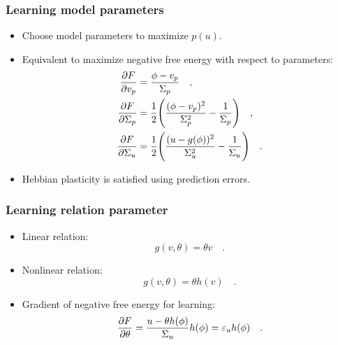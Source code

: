 \documentclass[aspectratio=43]{beamer}
\begin{document}
\begin{frame}
  \frametitle{Learning model parameters}
  \begin{itemize}
    \item<1-> Choose model parameters to maximize $p(u)$.
    \item<2-> Equivalent to maximize negative free energy with respect to parameters:
      \begin{align}
        \label{eq:gradient_mean_prior}
        \pdv{F}{v_p} & = \frac{\phi - v_p}{\Sigma_p}
        \quad , \\
        \label{eq:gradient_variance_prior}
        \pdv{F}{\Sigma_p} & = \frac{1}{2} \Bigg( \frac{(\phi - v_p)^2}{\Sigma_p^2} - \frac{1}{\Sigma_p} \Bigg)
        \quad , \\
        \label{eq:gradient_variance_stimulus}
        \pdv{F}{\Sigma_u} & = \frac{1}{2} \Bigg( \frac{(u - g(\phi))^2}{\Sigma_u^2} - \frac{1}{\Sigma_u} \Bigg)
        \quad .
      \end{align}
    \item<3-> Hebbian plasticity is satisfied using prediction errors.
  \end{itemize}
\end{frame}

\begin{frame}
  \frametitle{Learning relation parameter}
  \begin{itemize}
    \item<1-> Linear relation:
      \begin{equation}
        \label{eq:relation_linear}
        g(v, \theta) = \theta v
        \quad .
      \end{equation}
    \item<2-> Nonlinear relation:
      \begin{equation}
        \label{eq:relation_nonlinear}
        g(v, \theta) = \theta h(v)
        \quad .
      \end{equation}
    \item<3-> Gradient of negative free energy for learning:
      \begin{equation}
        \label{eq:relation_nonlinear}
        \pdv{F}{\theta} = \frac{u - \theta h(\phi)}{\Sigma_u} h(\phi) = \varepsilon_u h(\phi)
        \quad .
      \end{equation}
  \end{itemize}
\end{frame}
\end{document}
